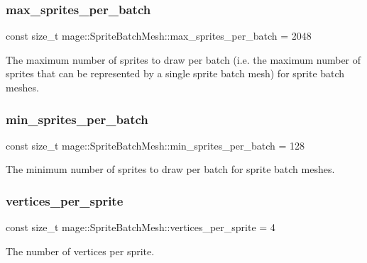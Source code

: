 \subsubsection{\texorpdfstring{max\+\_\+sprites\+\_\+per\+\_\+batch}{max\_sprites\_per\_batch}}
{\footnotesize\ttfamily const size\+\_\+t mage\+::\+Sprite\+Batch\+Mesh\+::max\+\_\+sprites\+\_\+per\+\_\+batch = 2048\hspace{0.3cm}{\ttfamily [static]}}

The maximum number of sprites to draw per batch (i.\+e. the maximum number of sprites that can be represented by a single sprite batch mesh) for sprite batch meshes. \hypertarget{classmage_1_1_sprite_batch_mesh_abf82001c09270c14695bec433cf9810d}{}\label{classmage_1_1_sprite_batch_mesh_abf82001c09270c14695bec433cf9810d} 
\subsubsection{\texorpdfstring{min\+\_\+sprites\+\_\+per\+\_\+batch}{min\_sprites\_per\_batch}}
{\footnotesize\ttfamily const size\+\_\+t mage\+::\+Sprite\+Batch\+Mesh\+::min\+\_\+sprites\+\_\+per\+\_\+batch = 128\hspace{0.3cm}{\ttfamily [static]}}

The minimum number of sprites to draw per batch for sprite batch meshes. \hypertarget{classmage_1_1_sprite_batch_mesh_a450088fe9797bc26008ede487b39f0d7}{}\label{classmage_1_1_sprite_batch_mesh_a450088fe9797bc26008ede487b39f0d7} 
\subsubsection{\texorpdfstring{vertices\+\_\+per\+\_\+sprite}{vertices\_per\_sprite}}
{\footnotesize\ttfamily const size\+\_\+t mage\+::\+Sprite\+Batch\+Mesh\+::vertices\+\_\+per\+\_\+sprite = 4\hspace{0.3cm}{\ttfamily [static]}}

The number of vertices per sprite. 